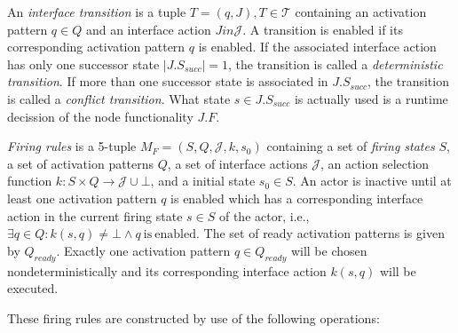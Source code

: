 \begin{definition}\label{interface-transition}
An \emph{interface transition} is a tuple $T = (q,J), T \in \mathcal{T}$ containing
an activation pattern $q \in Q$ and an interface action $J in \mathcal{J}$.
A transition is enabled if its corresponding activation pattern $q$ is enabled.
If the associated interface action has only one successor state $|J.S_{succ}| = 1$, the
transition is called a \emph{deterministic transition}.
If more than one successor state is associated in $J.S_{succ}$, the
transition is called a \emph{conflict transition}. What state $s \in J.S_{succ}$
is actually used is a runtime decission of the node functionality $J.F$.
\end{definition}

\begin{definition}\label{firing-rules}
\emph{Firing rules} is a 5-tuple $M_{F} = (S, Q, \mathcal{J}, k, s_0)$ containing
a set of \emph{firing states} $S$, a set of activation patterns $Q$,
a set of interface actions $\mathcal{J}$, an action selection function
$k: S \times Q \to \mathcal{J} \cup \bot$,
and a initial state $s_0 \in S$. An actor is inactive until at least
one activation pattern $q$ is enabled which has a corresponding
interface action in the current firing state $s \in S$ of the actor,
i.e., $\exists{q \in Q}: k(s,q) \ne \bot \wedge q\ \mathrm{is\ enabled}$.
The set of ready activation patterns is given by $Q_{ready}$.
Exactly one activation pattern $q \in Q_{ready}$ will be
chosen nondeterministically and its corresponding interface action
$k(s,q)$ will be executed.
\end{definition}

These firing rules are constructed by use of the following operations:

